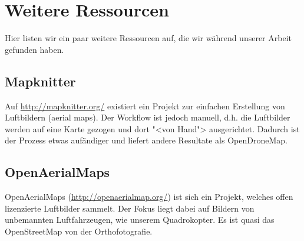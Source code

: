 
\section{Weitere Ressourcen}

Hier listen wir ein paar weitere Ressourcen auf, die wir während unserer Arbeit
gefunden haben.

\subsection{Mapknitter}

Auf \url{http://mapknitter.org/} existiert ein Projekt zur einfachen Erstellung
von Luftbildern (aerial maps). Der Workflow ist jedoch manuell, d.h. die
Luftbilder werden auf eine Karte gezogen und dort "<von Hand"> ausgerichtet.
Dadurch ist der Prozess etwas aufändiger und liefert andere Resultate als
OpenDroneMap.

\subsection{OpenAerialMaps}

OpenAerialMaps (\url{http://openaerialmap.org/}) ist sich ein Projekt, welches
offen lizenzierte Luftbilder sammelt. Der Fokus liegt dabei auf Bildern von
unbemannten Luftfahrzeugen, wie unserem Quadrokopter. Es ist quasi das
OpenStreetMap von der Orthofotografie.
